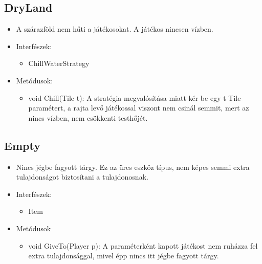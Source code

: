 \subsection{DryLand}
\begin{itemize}
	\item A szárazföld nem hűti a játékosokat. A játékos nincsen vízben.
	\item Interfészek:
	\begin{itemize}
		\item ChillWaterStrategy
	\end{itemize}
	\item Metódusok:
	\begin{itemize}
		\item void Chill(Tile t): A stratégia megvalósítása miatt kér be egy t Tile paramétert, a rajta levő játékossal viszont nem csinál semmit, mert az nincs vízben, nem csökkenti testhőjét.
	\end{itemize}
\end{itemize}

\subsection{Empty}
\begin{itemize}
	\item Nincs jégbe fagyott tárgy. Ez az üres eszköz típus, nem képes semmi extra tulajdonságot biztosítani a tulajdonosnak.
	\item Interfészek:
	\begin{itemize}
		\item Item
	\end{itemize}
	\item Metódusok
	\begin{itemize}
		\item void GiveTo(Player p): A paraméterként kapott játékost nem ruházza fel extra tulajdonsággal, mivel épp nincs itt jégbe fagyott tárgy.
	\end{itemize}
\end{itemize}

